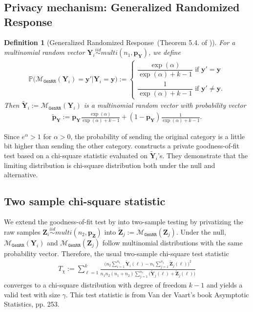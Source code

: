 \documentclass[11pt]{article} %
\newcommand{\vecBold}[1]{\boldsymbol{#1}} %
\newcommand{\sampleSize}{n}
\newcommand{\distparamMultinom}{\boldsymbol{p}}
\newcommand{\mP}{\mathbb{P}} %
\newcommand{\alphabetSize}{k}
\newcommand{\genrr}{\mathcal{M}_{\texttt{GenRR}}}
\newcommand{\rvY}{Y}
\newcommand{\rVecY}{\vecBold{\rvY}}
\newcommand{\rvZ}{Z}
\newcommand{\rVecZ}{\vecBold{\rvZ}}
\newtheorem{definition}{Definition}[section]
\begin{document}
\subsection{Privacy mechanism: Generalized Randomized Response}
\begin{definition}[Generalized Randomized Response~(Theorem 5.4. of \citet{Gaboardi2018LDPChisq})]
For a multinomial random vector 
$
\rVecY_i \stackrel{iid}{\sim}multi(\sampleSize_1, \distparamMultinom_{\rVecY})$, 
we define
\begin{align*}
\mP
\bigl(
\genrr(\rVecY_i) = \vecBold{y}'
|
\rVecY_i = \vecBold{y}
\bigr)
:=
\begin{cases}
\dfrac
	{\exp(\alpha)}
	{\exp(\alpha) + \alphabetSize - 1 }
	\text{ if }
	\vecBold{y}' = \vecBold{y}
	\\
\dfrac
	{1}
	{\exp(\alpha) + \alphabetSize - 1 }	
	\text{ if }
	\vecBold{y}' \neq \vecBold{y}.
\end{cases}
\end{align*}
Then  $\tilde{\rVecY}_i:=\genrr(\rVecY_i)$ is a multinomial random vector with probability vector
\begin{align*}
\tilde{\distparamMultinom}_{\rVecY}
:=
\distparamMultinom_{\rVecY}
	\frac
	{\exp(\alpha)}
	{\exp(\alpha) + \alphabetSize - 1 }
	+
(1-\distparamMultinom_{\rVecY})	
	\frac
	{1}
	{\exp(\alpha) + \alphabetSize - 1 }.
\end{align*}
\end{definition}
\noindent
Since $e^\alpha>1$ for $\alpha>0$, the probability of sending the original category is a little bit higher than sending the other category.
\citet{Gaboardi2018LDPChisq} constructs a private goodness-of-fit test based on a chi-square statistic evaluated on $\tilde{\rVecY}_i$'s.
They demonstrate that the limiting distribution is chi-square distribution both under the null and alternative.



\subsection{Two sample chi-square statistic}
We extend the goodness-of-fit test by \citet{Gaboardi2018LDPChisq} into two-sample testing by privatizing the raw samples
$\rVecZ_i \stackrel{iid}{\sim}multi(\sampleSize_2, \distparamMultinom_{\rVecZ})$
into $\tilde{\rVecZ}_j := \genrr(\rVecZ_j)$. 
Under the null, $\genrr(\rVecY_i)$ and $\genrr(\rVecZ_j)$ follow multinomial distributions with the same probability vector.
 Therefore, the usual two-sample chi-square test statistic
 	\begin{align*}
		T_{\chi} :=
		\sum_{\ell=1}^k
		\frac{
		\bigl(
		n_2
		\sum_{i=1}^{n_1}\tilde{\rVecY}_i(\ell)
		-
		n_1
		\sum_{j=1}^{n_1}\tilde{\rVecZ}_j(\ell)
		\bigr)^2
		}{
		n_1 n_2 (n_1 + n_2) 
		\sum_{j=1}^{n_1}
		\bigl(
		\tilde{\rVecY}_j(\ell)+\tilde{\rVecZ}_j(\ell)
		\bigr)
		}
	\end{align*}
  converges to a chi-square distribution with degree of freedom $\alphabetSize-1$ and yields a valid  test with size $\gamma$.
This test statistic is from Van der Vaart's book Asymptotic Statistics, pp. 253.
\end{document}
